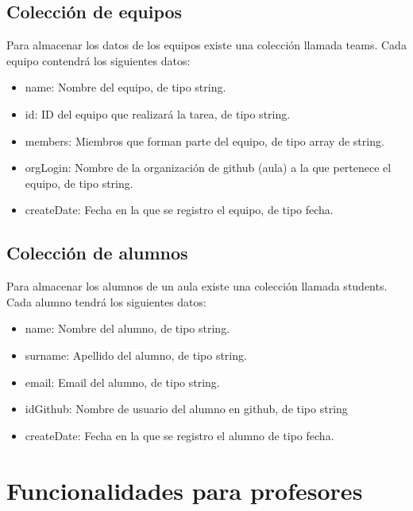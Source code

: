 \subsection{Colección de equipos}
\label{3:4:6}

Para almacenar los datos de los equipos existe una colección llamada teams. Cada equipo contendrá los siguientes datos:

\begin{itemize}
  \item name: Nombre del equipo, de tipo string.
  \item id: ID del equipo que realizará la tarea, de tipo string.
  \item members: Miembros que forman parte del equipo, de tipo array de string.
  \item orgLogin: Nombre de la organización de github (aula) a la que pertenece el equipo, de tipo string.
  \item createDate: Fecha en la que se registro el equipo, de tipo fecha.
\end{itemize}

\subsection{Colección de alumnos}
\label{3:4:7}

Para almacenar los alumnos de un aula existe una colección llamada students. Cada alumno tendrá los siguientes datos:

\begin{itemize}
  \item name: Nombre del alumno, de tipo string.
  \item surname: Apellido del alumno, de tipo string.
  \item email: Email del alumno, de tipo string.
  \item idGithub: Nombre de usuario del alumno en github, de tipo string
  \item createDate: Fecha en la que se registro el alumno de tipo fecha.
\end{itemize}

\section{Funcionalidades para profesores}
\label{:sec5}



